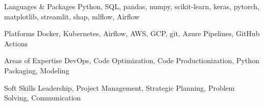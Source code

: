 
\begin{cvskills}

  \cvskill
    {Languages \& Packages} %
    {Python, SQL, pandas, numpy, scikit-learn, keras, pytorch, matplotlib, streamlit, shap, mlflow, Airflow} %

  \cvskill
    {Platforms} %
    {Docker, Kubernetes, Airflow, AWS, GCP, git, Azure Pipelines, GitHub Actions} %

  \cvskill
    {Areas of Expertise}
    {DevOps, Code Optimization, Code Productionization, Python Packaging, Modeling}

  \cvskill
    {Soft Skills}
    {Leadership, Project Management, Strategic Planning, Problem Solving, Communication}

\end{cvskills}